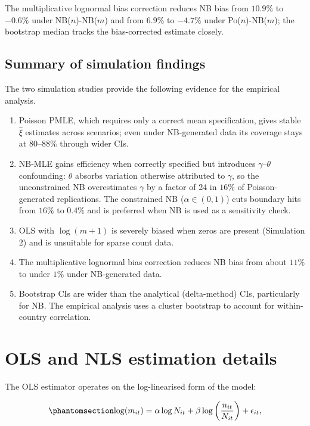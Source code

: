The multiplicative lognormal bias correction reduces NB bias from
$10.9\%$ to $-0.6\%$ under NB($n$)-NB($m$) and from $6.9\%$ to $-4.7\%$ under
Po($n$)-NB($m$); the bootstrap median tracks the bias-corrected estimate
closely.



\subsection{Summary of simulation findings}\label{sec-appendix-sim-summary}

The two simulation studies provide the following evidence for the
empirical analysis.

\begin{enumerate}
\item Poisson PMLE, which requires only a correct mean specification,
  gives stable $\hat\xi$ estimates across scenarios; even under
  NB-generated data its coverage stays at $80$--$88\%$ through wider CIs.
\item NB-MLE gains efficiency when correctly specified but introduces
  $\gamma$--$\theta$ confounding: $\theta$ absorbs variation otherwise
  attributed to $\gamma$, so the unconstrained NB overestimates $\gamma$
  by a factor of 24 in $16\%$ of Poisson-generated replications. The
  constrained NB ($\alpha \in (0,1)$) cuts boundary hits from $16\%$ to
  $0.4\%$ and is preferred when NB is used as a sensitivity check.
\item OLS with $\log(m+1)$ is severely biased when zeros are present
  (Simulation 2) and is unsuitable for sparse count data.
\item The multiplicative lognormal bias correction reduces NB bias from
  about $11\%$ to under $1\%$ under NB-generated data.
\item Bootstrap CIs are wider than the analytical (delta-method) CIs,
  particularly for NB. The empirical analysis uses a cluster bootstrap to
  account for within-country correlation.
\end{enumerate}


\clearpage

\section{OLS and NLS estimation details}\label{sec-appendix-ols-nls}

The OLS estimator operates on the
log-linearised form of the model:

\begin{equation}\protect\phantomsection\label{eq-ols-model}{
\log(m_{it}) = \alpha \log N_{it} + \beta \log\left(\frac{n_{it}}{N_{it}}\right) + \epsilon_{it},
}\end{equation}

